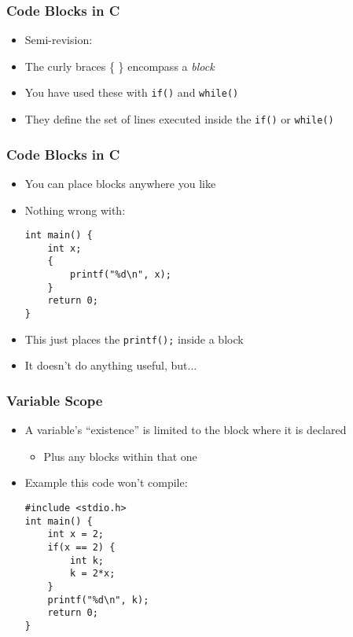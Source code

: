 \documentclass[14pt]{beamer}
\begin{document}
\begin{frame}[fragile]
\frametitle{Code Blocks in C}
\begin{itemize}
\item Semi-revision:
\item The curly braces \{ \} encompass a \textit{block}
\item You have used these with \texttt{if()} and \texttt{while()}
\item They define the set of lines executed inside the \texttt{if()} or \texttt{while()}

\end{itemize}
\end{frame}

\begin{frame}[fragile]
\frametitle{Code Blocks in C}
\begin{itemize}
\item You can place blocks anywhere you like
\item Nothing wrong with:
\begin{lstlisting}[style=CStyle]
int main() {
	int x;
	{
		printf("%d\n", x);
	}
	return 0;
}
\end{lstlisting}
\item This just places the \texttt{printf();} inside a block
\item It doesn't do anything useful, but...
\end{itemize}
\end{frame}

\begin{frame}[fragile]
\frametitle{Variable Scope}
\begin{itemize}
\item A variable's ``existence'' is limited to the block where it is declared
	\begin{itemize}
		\item Plus any blocks within that one
	\end{itemize}
\item Example this code won't compile:
\begin{lstlisting}[style=CStyle]
#include <stdio.h>
int main() {
	int x = 2;
	if(x == 2) {
		int k;
		k = 2*x;
	}
	printf("%d\n", k);
	return 0;
}
\end{lstlisting}
\end{itemize}
\end{frame}
\end{document}

